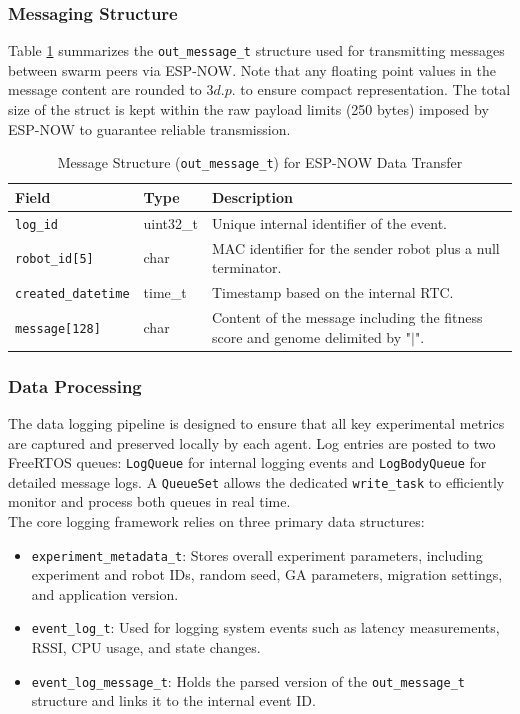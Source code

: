 \documentclass[conference]{IEEEtran}
\begin{document}
\subsubsection{Messaging Structure}

Table \ref{tab:out_message} summarizes the \texttt{out\_message\_t} structure used for transmitting messages between swarm peers via ESP-NOW. Note that any floating point values in the message content are rounded to $3 d.p.$ to ensure compact representation. The total size of the struct is kept within the raw payload limits (250 bytes) imposed by ESP-NOW to guarantee reliable transmission.

\begin{table}[h]
  \centering
  \caption{Message Structure (\texttt{out\_message\_t}) for ESP-NOW Data Transfer}
  \label{tab:out_message}
  \begin{tabular}{l l p{4cm}}
    \toprule
    \textbf{Field} & \textbf{Type} & \textbf{Description} \\
    \midrule
    \texttt{log\_id} & uint32\_t & Unique internal identifier of the event.\\
    \texttt{robot\_id[5]} & char & MAC identifier for the sender robot plus a null terminator.\\
    \texttt{created\_datetime} & time\_t & Timestamp based on the internal RTC.\\
    \texttt{message[128]} & char & Content of the message including the fitness score and genome delimited by "$|$".\\
    \bottomrule
  \end{tabular}
\end{table}

\subsubsection{Data Processing}

The data logging pipeline is designed to ensure that all key experimental metrics are captured and preserved locally by each agent. Log entries are posted to two FreeRTOS queues: \texttt{LogQueue} for internal logging events and \texttt{LogBodyQueue} for detailed message logs. A \texttt{QueueSet} allows the dedicated \texttt{write\_task} to efficiently monitor and process both queues in real time.\\

The core logging framework relies on three primary data structures:
\begin{itemize}
    \item \texttt{experiment\_metadata\_t}: Stores overall experiment parameters, including experiment and robot IDs, random seed, GA parameters, migration settings, and application version.
    \item \texttt{event\_log\_t}: Used for logging system events such as latency measurements, RSSI, CPU usage, and state changes.
    \item \texttt{event\_log\_message\_t}: Holds the parsed version of the \texttt{out\_message\_t} structure and links it to the internal event ID.
\end{itemize}
\end{document}
